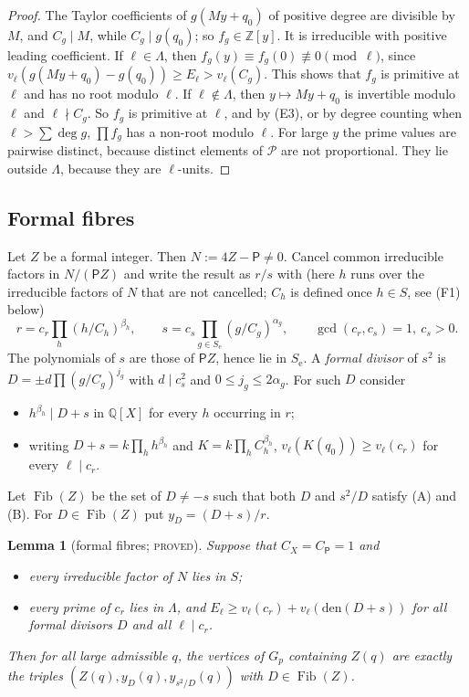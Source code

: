 \documentclass[11pt,reqno]{amsart}
\newtheorem{lemma}[theorem]{Lemma}
\theoremstyle{definition}
\newcommand{\Z}{\mathbb Z}
\newcommand{\Q}{\mathbb Q}
\newcommand{\Pp}{\mathsf P}
\newcommand{\cP}{\mathcal P}
\newcommand{\Se}{S_{\mathrm e}}
\newcommand{\Fib}{\operatorname{Fib}}
\newcommand{\status}[1]{\textsc{#1}}
\begin{document}
\begin{proof}
The Taylor coefficients of $g(My+q_0)$ of positive degree are divisible by
$M$, and $C_g\mid M$, while $C_g\mid g(q_0)$; so $f_g\in\Z[y]$.  It is
irreducible with positive leading coefficient.  If $\ell\in\Lambda$, then
$f_g(y)\equiv f_g(0)\not\equiv0\pmod\ell$, since
$v_\ell(g(My+q_0)-g(q_0))\ge E_\ell>v_\ell(C_g)$.  This shows that $f_g$ is
primitive at $\ell$ and has no root modulo $\ell$.  If $\ell\notin\Lambda$,
then $y\mapsto My+q_0$ is invertible modulo $\ell$ and $\ell\nmid C_g$.  So
$f_g$ is primitive at $\ell$, and by (E3), or by degree counting when
$\ell>\sum\deg g$, $\prod f_g$ has a non-root modulo $\ell$.  For large
$y$ the prime values are pairwise distinct, because distinct elements of
$\cP$ are not proportional.  They lie outside $\Lambda$, because they are
$\ell$-units.
\end{proof}

\subsection{Formal fibres}
Let $Z$ be a formal integer.  Then $N:=4Z-\Pp\ne0$.  Cancel common
irreducible factors in $N/(\Pp Z)$ and write the result as $r/s$ with (here
$h$ runs over the irreducible factors of $N$ that are not cancelled; $C_h$
is defined once $h\in S$, see (F1) below)
\[
 r=c_r\prod_h(h/C_h)^{\beta_h},\qquad s=c_s\prod_{g\in\Se}(g/C_g)^{\alpha_g},
 \qquad\gcd(c_r,c_s)=1,\ c_s>0 .
\]
The polynomials of $s$ are those of $\Pp Z$, hence lie in $\Se$.  A
\emph{formal divisor} of $s^2$ is $D=\pm d\prod(g/C_g)^{j_g}$ with
$d\mid c_s^2$ and $0\le j_g\le2\alpha_g$.  For such $D$ consider
\begin{itemize}
\item[(A)] $h^{\beta_h}\mid D+s$ in $\Q[X]$ for every $h$ occurring in $r$;
\item[(B)] writing $D+s=k\prod_h h^{\beta_h}$ and
$K=k\prod_hC_h^{\beta_h}$, $v_\ell(K(q_0))\ge v_\ell(c_r)$ for every
$\ell\mid c_r$.
\end{itemize}
Let $\Fib(Z)$ be the set of $D\ne-s$ such that both $D$ and $s^2/D$ satisfy
(A) and (B).  For $D\in\Fib(Z)$ put $y_D=(D+s)/r$.

\begin{lemma}[formal fibres; \status{proved}]\label{lem:formalfibre}
Suppose that $C_X=C_\Pp=1$ and
\begin{itemize}
\item[(F1)] every irreducible factor of $N$ lies in $S$;
\item[(F2)] every prime of $c_r$ lies in $\Lambda$, and
$E_\ell\ge v_\ell(c_r)+v_\ell(\mathrm{den}(D+s))$ for all formal divisors
$D$ and all $\ell\mid c_r$.
\end{itemize}
Then for all large admissible $q$, the vertices of $G_p$ containing $Z(q)$
are exactly the triples $(Z(q),y_D(q),y_{s^2/D}(q))$ with $D\in\Fib(Z)$.
\end{lemma}
\end{document}
